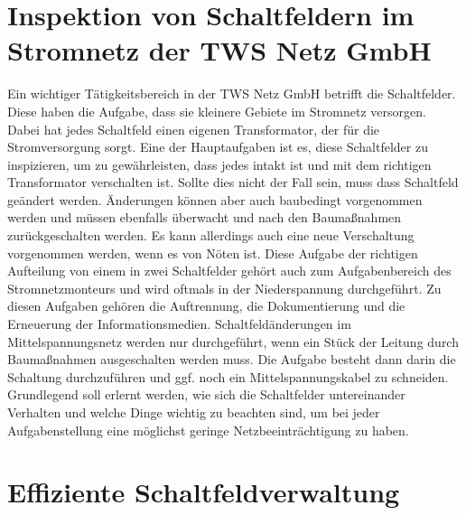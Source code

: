 \section{Inspektion von Schaltfeldern im Stromnetz der TWS Netz GmbH}

Ein wichtiger Tätigkeitsbereich in der TWS Netz GmbH betrifft die Schaltfelder. Diese haben die Aufgabe, dass sie kleinere Gebiete im Stromnetz versorgen. 
Dabei hat jedes Schaltfeld einen eigenen Transformator, der für die Stromversorgung sorgt. Eine der Hauptaufgaben ist es, diese Schaltfelder zu inspizieren, 
um zu gewährleisten, dass jedes intakt ist und mit dem richtigen Transformator verschalten ist. Sollte dies nicht der Fall sein, muss dass Schaltfeld geändert 
werden. Änderungen können aber auch baubedingt vorgenommen werden und müssen ebenfalls überwacht und nach den Baumaßnahmen zurückgeschalten werden. Es kann 
allerdings auch eine neue Verschaltung vorgenommen werden, wenn es von Nöten ist. Diese Aufgabe der richtigen Aufteilung von einem in zwei Schaltfelder 
gehört auch zum Aufgabenbereich des Stromnetzmonteurs und wird oftmals in der Niederspannung durchgeführt. Zu diesen Aufgaben gehören \zB die Auftrennung, 
die Dokumentierung und die Erneuerung der Informationsmedien. Schaltfeldänderungen im Mittelspannungsnetz werden nur durchgeführt, wenn ein Stück der 
Leitung durch Baumaßnahmen ausgeschalten werden muss. Die Aufgabe besteht dann darin die Schaltung durchzuführen und ggf. noch ein Mittelspannungskabel zu 
schneiden. Grundlegend soll erlernt werden, wie sich die Schaltfelder untereinander Verhalten und welche Dinge wichtig zu beachten sind, um bei jeder 
Aufgabenstellung eine möglichst geringe Netzbeeinträchtigung zu haben. 
\clearpage

\section{Effiziente Schaltfeldverwaltung}

